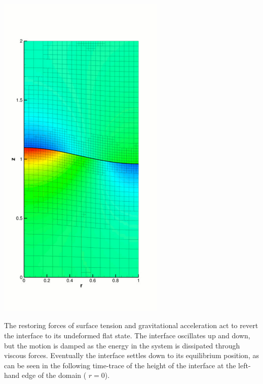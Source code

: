  
\begin{DoxyImage}
\includegraphics[width=0.6\textwidth]{two_layer_interface_axisym}
\end{DoxyImage}


The restoring forces of surface tension and gravitational acceleration act to revert the interface to its undeformed flat state. The interface oscillates up and down, but the motion is damped as the energy in the system is dissipated through viscous forces. Eventually the interface settles down to its equilibrium position, as can be seen in the following time-\/trace of the height of the interface at the left-\/hand edge of the domain ( $ r=0 $).

